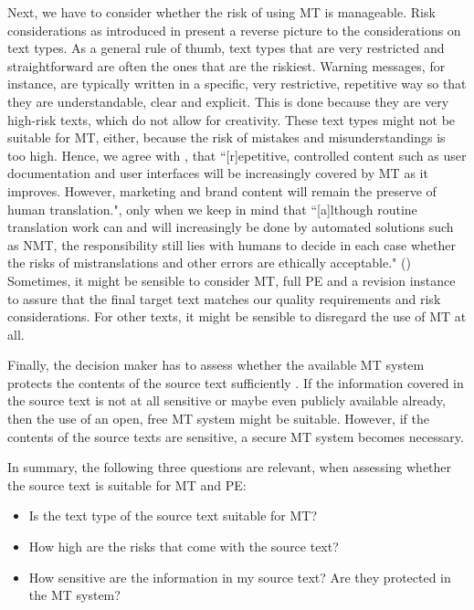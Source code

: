 Next, we have to consider whether the risk of using MT is manageable. Risk considerations as introduced in  present a reverse picture to the considerations on text types. As a general rule of thumb, text types that are very restricted and straightforward are often the ones that are the riskiest. Warning messages, for instance, are typically written in a specific, very restrictive, repetitive way so that they are understandable, clear and explicit. This is done because they are very high-risk texts, which do not allow for creativity. These text types might not be suitable for MT, either, because the risk of mistakes and misunderstandings is too high. Hence, we agree with \citet[303-304]{massey2017machine}, that ``[r]epetitive, controlled content such as user documentation and user interfaces will be increasingly covered by MT as it improves. However, marketing and brand content will remain the preserve of human translation.", only when we keep in mind that ``[a]lthough routine translation work can and will increasingly be done by automated solutions such as NMT, the responsibility still lies with humans to decide in each case whether the risks of mistranslations and other errors are ethically acceptable." (\citealt[309]{massey2017machine}) Sometimes, it might be sensible to consider MT, full PE and a revision instance to assure that the final target text matches our quality requirements and risk considerations. For other texts, it might be sensible to disregard the use of MT at all.

Finally, the decision maker has to assess whether the available MT system protects the contents of the source text sufficiently . If the information covered in the source text is not at all sensitive or maybe even publicly available already, then the use of an open, free MT system might be suitable. However, if the contents of the source texts are sensitive, a secure MT system becomes necessary. 

In summary, the following three questions are relevant, when assessing whether the source text is suitable for MT and PE:
\begin{itemize}
    \item Is the text type of the source text suitable for MT?
    \item How high are the risks that come with the source text?
    \item How sensitive are the information in my source text? Are they protected in the MT system?
\end{itemize}

